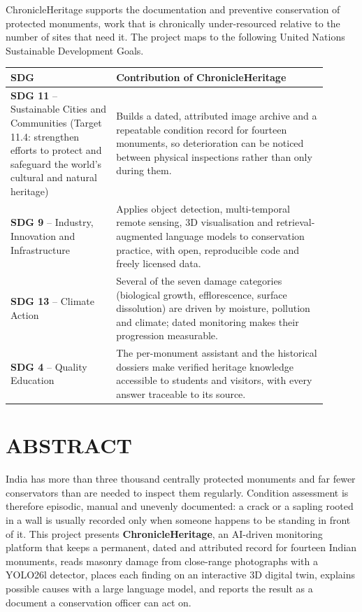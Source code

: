 \documentclass[a4paper,12pt,oneside]{book}
\begin{document}
ChronicleHeritage supports the documentation and preventive conservation of protected monuments, work that is chronically under-resourced relative to the number of sites that need it. The project maps to the following United Nations Sustainable Development Goals.

\begin{center}
\renewcommand{\arraystretch}{1.35}
\begin{tabular}{|p{0.30\linewidth}|p{0.60\linewidth}|}
\hline
\textbf{SDG} & \textbf{Contribution of ChronicleHeritage} \\ \hline
\textbf{SDG 11} -- Sustainable Cities and Communities (Target 11.4: strengthen efforts to protect and safeguard the world's cultural and natural heritage) & Builds a dated, attributed image archive and a repeatable condition record for fourteen monuments, so deterioration can be noticed between physical inspections rather than only during them. \\ \hline
\textbf{SDG 9} -- Industry, Innovation and Infrastructure & Applies object detection, multi-temporal remote sensing, 3D visualisation and retrieval-augmented language models to conservation practice, with open, reproducible code and freely licensed data. \\ \hline
\textbf{SDG 13} -- Climate Action & Several of the seven damage categories (biological growth, efflorescence, surface dissolution) are driven by moisture, pollution and climate; dated monitoring makes their progression measurable. \\ \hline
\textbf{SDG 4} -- Quality Education & The per-monument assistant and the historical dossiers make verified heritage knowledge accessible to students and visitors, with every answer traceable to its source. \\ \hline
\end{tabular}
\end{center}

\clearpage
{}
{}
\chapter*{ABSTRACT}

India has more than three thousand centrally protected monuments and far fewer conservators than are needed to inspect them regularly. Condition assessment is therefore episodic, manual and unevenly documented: a crack or a sapling rooted in a wall is usually recorded only when someone happens to be standing in front of it. This project presents \textbf{ChronicleHeritage}, an AI-driven monitoring platform that keeps a permanent, dated and attributed record for fourteen Indian monuments, reads masonry damage from close-range photographs with a YOLO26l detector, places each finding on an interactive 3D digital twin, explains possible causes with a large language model, and reports the result as a document a conservation officer can act on.
\end{document}
